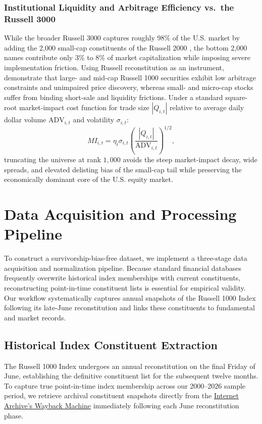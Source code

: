 \subsubsection*{Institutional Liquidity and Arbitrage Efficiency vs.\ the Russell 3000}
While the broader Russell 3000 captures roughly 98\% of the U.S. market by adding the 2,000 small-cap constituents of the Russell 2000 \cite{ftserussell2026}, the bottom 2,000 names contribute only 3\% to 8\% of market capitalization while imposing severe implementation friction. Using Russell reconstitution as an instrument, \cite{patatoukas2022} demonstrate that large- and mid-cap Russell 1000 securities exhibit low arbitrage constraints and unimpaired price discovery, whereas small- and micro-cap stocks suffer from binding short-sale and liquidity frictions. Under a standard square-root market-impact cost function for trade size $|Q_{i,t}|$ relative to average daily dollar volume $\mathrm{ADV}_{i,t}$ and volatility $\sigma_{i,t}$:
\begin{equation}
	MI_{i,t} = \eta_i \sigma_{i,t} \left( \dfrac{|Q_{i,t}|}{\mathrm{ADV}_{i,t}} \right)^{1/2},
	\label{eq:market_impact}
\end{equation}
truncating the universe at rank $1{,}000$ avoids the steep market-impact decay, wide spreads, and elevated delisting bias of the small-cap tail while preserving the economically dominant core of the U.S. equity market.

\section{Data Acquisition and Processing Pipeline} \label{sec:data-acquisition}
To construct a survivorship-bias-free dataset, we implement a three-stage data acquisition and normalization pipeline. Because standard financial databases frequently overwrite historical index memberships with current constituents, reconstructing point-in-time constituent lists is essential for empirical validity. Our workflow systematically captures annual snapshots of the Russell 1000 Index following its late-June reconstitution and links these constituents to fundamental and market records.

\subsection{Historical Index Constituent Extraction}
The Russell 1000 Index undergoes an annual reconstitution on the final Friday of June, establishing the definitive constituent list for the subsequent twelve months. To capture true point-in-time index membership across our 2000--2026 sample period, we retrieve archival constituent snapshots directly from the \href{web.archive.org}{Internet Archive's Wayback Machine} immediately following each June reconstitution phase.

